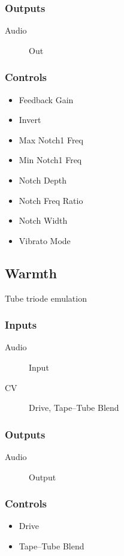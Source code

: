 \subsubsection{Outputs}
\begin{description}
\item [Audio] Out
\end{description}

\subsubsection{Controls}
\begin{itemize}
\item Feedback Gain
\item Invert
\item Max Notch1 Freq
\item Min Notch1 Freq
\item Notch Depth
\item Notch Freq Ratio
\item Notch Width
\item Vibrato Mode
\end{itemize}

\subsection{Warmth}

Tube triode emulation



\subsubsection{Inputs}
\begin{description}
\item [Audio] Input
\item [CV] Drive, Tape--Tube Blend
\end{description}

\subsubsection{Outputs}
\begin{description}
\item [Audio] Output
\end{description}

\subsubsection{Controls}
\begin{itemize}
\item Drive
\item Tape--Tube Blend
\end{itemize}

